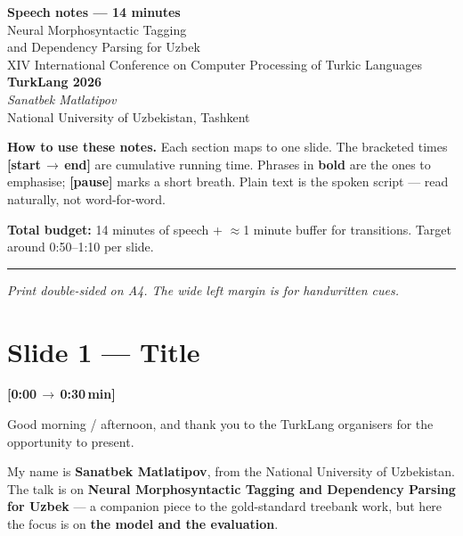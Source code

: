 \documentclass[12pt,a4paper]{article}
\newcommand{\timing}[2]{%
   \par\noindent\textbf{\small [#1\,$\to$\,#2\,min]}\par\vspace{0.2em}}
\newcommand{\say}[1]{\textbf{#1}}
\begin{document}
\begin{center}
   {\LARGE\bfseries Speech notes --- 14 minutes}\\[0.6em]
   {\large Neural Morphosyntactic Tagging\\and Dependency Parsing for Uzbek}\\[0.4em]
   {\normalsize XIV International Conference on Computer Processing of Turkic Languages}\\
   {\normalsize \textbf{TurkLang 2026}}\\[1.2em]
   \textit{Sanatbek Matlatipov}\\
   National University of Uzbekistan, Tashkent
\end{center}

\vspace{1em}
\noindent\textbf{How to use these notes.}
Each section maps to one slide. The bracketed times
\textbf{[start\,$\to$\,end]} are cumulative running time. Phrases in
\textbf{bold} are the ones to emphasise; \textbf{[pause]} marks a short
breath. Plain text is the spoken script --- read naturally, not
word-for-word.

\vspace{0.5em}
\noindent\textbf{Total budget:} 14 minutes of speech + $\approx$1 minute
buffer for transitions. Target around 0:50--1:10 per slide.

\vfill\hrule\vspace{0.5em}
\noindent\textit{Print double-sided on A4. The wide left margin is for handwritten cues.}

\newpage

\section*{Slide 1 --- Title}
\timing{0:00}{0:30}

Good morning / afternoon, and thank you to the TurkLang organisers for
the opportunity to present.

My name is \say{Sanatbek Matlatipov}, from the National University of
Uzbekistan. The talk is on \say{Neural Morphosyntactic Tagging and
Dependency Parsing for Uzbek} --- a companion piece to the gold-standard
treebank work, but here the focus is on \say{the model and the
evaluation}.
\end{document}
